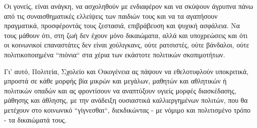 \documentclass[12pt,a4paper,oneside]{book}
\begin{document}
\indent Οι γονείς, είναι ανάγκη, να ασχοληθούν με ενδιαφέρον και να σκύψουν
άγρυπνα πάνω από τις συναισθηματικές ελλείψεις των παιδιών τους και να τα αγαπήσουν πραγματικά, προσφέροντάς τους
ζεστασιά, επιβράβευση και ψυχική ασφάλεια. Να τους μάθουν ότι, στη ζωή δεν έχουν
μόνο δικαιώματα, αλλά και υποχρεώσεις και ότι οι κοινωνικοί επαναστάτες δεν
είναι χούλιγκανς, ούτε ρατσιστές, ούτε βάνδαλοι, ούτε πολιτικοποιημένα
``πιόνια`` στα χέρια των εκάστοτε πολιτικών σκοπιμοτήτων.

\indent Γι' αυτό, Πολιτεία, Σχολείο και Οικογένεια ας πάψουν να εθελοτυφλούν
υποκριτικά, μπροστά σε κάθε μορφής βία μικρών και μεγάλων, μαθητών και αθλητικών ή πολιτικών οπαδών και ας φροντίσουν
να αναπτύξουν υγιείς μορφές διασκέδασης, μάθησης και άθλησης, με την ανάδειξη
ουσιαστικά καλλιεργημένων πολιτών, που θα μετέχουν στο κοινωνικό ``γίγνεσθαι``,
διεκδικώντας - με νόμιμο και πολιτισμένο τρόπο - τα δικαιώματά τους.
\end{document}
